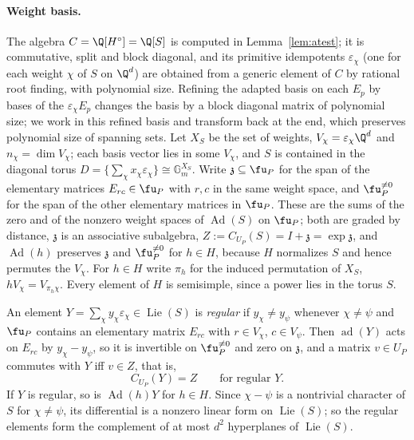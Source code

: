 \paragraph{Weight basis.} The algebra $C=\Q[H^\circ]=\Q[S]$ is computed in Lemma~\ref{lem:atest}; it
is commutative, split and block diagonal, and its primitive idempotents $\varepsilon_\chi$ (one for
each weight $\chi$ of $S$ on $\Q^d$) are obtained from a generic element of $C$ by rational root
finding, with polynomial size. Refining the adapted basis on each $E_p$ by bases of the
$\varepsilon_\chi E_p$ changes the basis by a block diagonal matrix of polynomial size; we work in
this refined basis and transform back at the end, which preserves polynomial size of spanning sets.
Let $X_S$ be the set of weights, $V_\chi=\varepsilon_\chi\Q^d$ and $n_\chi=\dim V_\chi$; each basis
vector lies in some $V_\chi$, and $S$ is contained in the diagonal torus
$D=\{\sum_\chi x_\chi\varepsilon_\chi\}\cong\mathbb G_m^{X_S}$. Write $\mathfrak z\subseteq\fu_P$ for
the span of the elementary matrices $E_{rc}\in\fu_P$ with $r,c$ in the same weight space, and
$\fu_P^{\ne0}$ for the span of the other elementary matrices in $\fu_P$. These are the sums of the
zero and of the nonzero weight spaces of $\operatorname{Ad}(S)$ on $\fu_P$; both are graded by distance,
$\mathfrak z$ is an associative subalgebra, $Z:=C_{U_P}(S)=I+\mathfrak z=\exp\mathfrak z$, and
$\operatorname{Ad}(h)$ preserves $\mathfrak z$ and $\fu_P^{\ne0}$ for $h\in H$, because $H$ normalizes $S$ and
hence permutes the $V_\chi$. For $h\in H$ write $\pi_h$ for the induced permutation of $X_S$,
$hV_\chi=V_{\pi_h\chi}$. Every element of $H$ is semisimple, since a power lies in the torus $S$.

An element $Y=\sum_\chi y_\chi\varepsilon_\chi\in\operatorname{Lie}(S)$ is \emph{regular} if
$y_\chi\ne y_\psi$ whenever $\chi\ne\psi$ and $\fu_P$ contains an elementary matrix $E_{rc}$ with
$r\in V_\chi$, $c\in V_\psi$. Then $\operatorname{ad}(Y)$ acts on $E_{rc}$ by $y_\chi-y_\psi$, so it is invertible on
$\fu_P^{\ne0}$ and zero on $\mathfrak z$, and a matrix $v\in U_P$ commutes with $Y$ iff $v\in Z$, that is,
\begin{equation}\label{eq:regcent}
C_{U_P}(Y)=Z\qquad\text{for regular }Y.
\end{equation}
If $Y$ is regular, so is $\operatorname{Ad}(h)Y$ for $h\in H$. Since $\chi-\psi$ is a nontrivial character of
$S$ for $\chi\ne\psi$, its differential is a nonzero linear form on $\operatorname{Lie}(S)$; so the regular elements
form the complement of at most $d^2$ hyperplanes of $\operatorname{Lie}(S)$.

